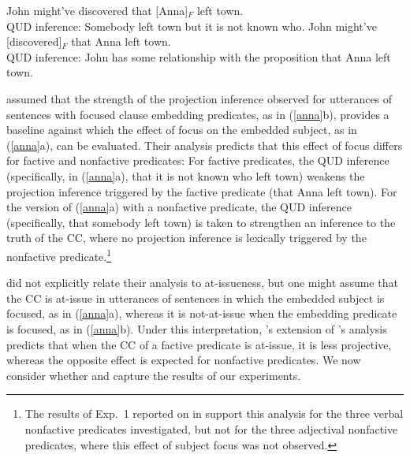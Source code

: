 \documentclass[11pt,fleqn]{article}
\newcommand{\6}{\mbox{$[\hspace*{-.6mm}[$}}
\newcommand{\9}{\mbox{$]\hspace*{-.6mm}]$}}
\newcommand{\citepos}[1]{\citeauthor{#1}'s \citeyear{#1}}
\begin{document}
\begin{exe}
\ex\label{anna} \citealt[73]{djaerv-bacovcin2020}
\begin{xlist}
\ex John might've discovered that [Anna]$_F$ left town. \\ QUD inference: Somebody left town but it is not known who.
\ex John might've [discovered]$_F$ that Anna left town.  \\ QUD inference: John has some relationship with the proposition that Anna left town.
\end{xlist}
\end{exe}
\citealt{djaerv-bacovcin2020} assumed that the strength of the projection inference observed for utterances of sentences with focused clause embedding predicates, as in (\ref{anna}b), provides a baseline against which the effect of focus on the embedded subject, as in (\ref{anna}a), can be evaluated. Their analysis predicts that this effect of focus differs for factive and nonfactive predicates: For factive predicates, the QUD inference (specifically, in (\ref{anna}a), that it is not known who left town) weakens the projection inference triggered by the factive predicate (that Anna left town). For the version of (\ref{anna}a) with a nonfactive predicate, the QUD inference (specifically, that somebody left town) is taken to strengthen an inference to the truth of the CC, where no projection inference is lexically triggered by the nonfactive predicate.\footnote{The results of Exp.~1 reported on in \citealt{djaerv-bacovcin2020} support this analysis for the three verbal nonfactive predicates investigated, but not for the three adjectival nonfactive predicates, where this effect of subject focus was not observed.}

\citealt{djaerv-bacovcin2020} did not explicitly relate their analysis to at-issueness, but one might assume that the CC is at-issue in utterances of sentences in which the embedded subject is focused, as in (\ref{anna}a), whereas it is not-at-issue when the embedding predicate is focused, as in (\ref{anna}b). Under this interpretation,  \citepos{djaerv-bacovcin2020} extension of \citepos{heim83} analysis predicts that when the CC of a factive predicate is at-issue, it is less projective, whereas the opposite effect is expected for nonfactive predicates. We now consider whether \citealt{heim83} and \citealt{djaerv-bacovcin2020} capture the results of our experiments. 
\end{document}
